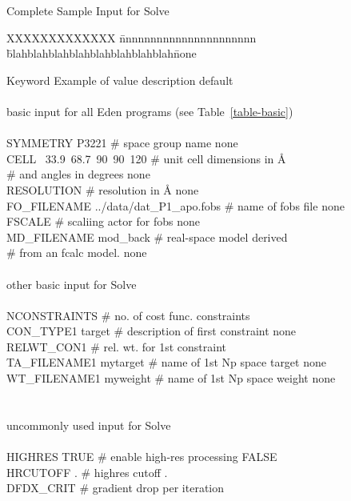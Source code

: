 \documentclass{report}
\begin{document}
\begin{table} [p]
\caption {\large Complete Sample Input for Solve}
\label{table-solve}

\begin{tabbing}
XXXXXXXXXXXXX \= nnnnnnnnnnnnnnnnnnnnnn \= 
blahblahblahblahblahblahblahblah\= none \kill

Keyword \> Example of value \> description \> default \\
\\
\> basic input for all Eden programs (see Table~\ref{table-basic}) \> \\
\\
SYMMETRY \> P3221 \> \# space group name \>  none \\
CELL ~33.9~68.7~90~90~120 \> \# unit cell dimensions in \AA \> \\
\> \> \# and angles in degrees \> none \\
RESOLUTION  \> \# resolution in \AA \> none \\
FO\_FILENAME \> ../data/dat\_P1\_apo.fobs  \> \# name of fobs file \> none \\
FSCALE    \> \# scaliing actor for fobs \> none \\
MD\_FILENAME \> mod\_back    \> \# real-space model derived \\
\> \> \# from an fcalc model.   \> none \\
\\
\> other basic input for Solve  \> \\
\\
NCONSTRAINTS  \> \# no. of cost func. constraints  \\
CON\_TYPE1 \> target \> \# description of first constraint \> none \\
RELWT\_CON1  \> \# rel. wt. for 1st constraint  \\
TA\_FILENAME1 \> mytarget \> \# name of 1st Np space target \> none \\
WT\_FILENAME1 \> myweight \> \# name of 1st Np space weight\> none \\
\\
\\
\> uncommonly used input for Solve  \> \\
\\
HIGHRES \> TRUE \> \# enable high-res processing \> FALSE \\
HRCUTOFF . \> \#  highres cutoff . \\
DFDX\_CRIT  \> \# gradient drop per iteration  \\

\end{tabbing}
\end{table}
\end{document}
